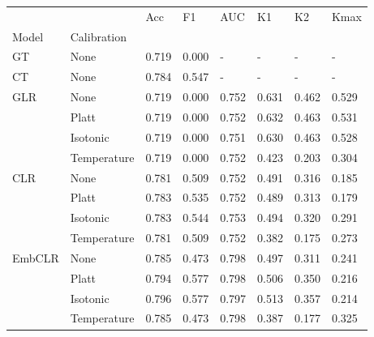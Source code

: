 \begin{tabular}{llllllll}
\toprule
 &  & Acc & F1 & AUC & K1 & K2 & Kmax \\
Model & Calibration &  &  &  &  &  &  \\
\midrule
GT & None & 0.719 & 0.000 & - & - & - & - \\
\cline{1-8}
CT & None & 0.784 & 0.547 & - & - & - & - \\
\cline{1-8}
\multirow[t]{4}{*}{GLR} & None & 0.719 & 0.000 & 0.752 & 0.631 & 0.462 & 0.529 \\
 & Platt & 0.719 & 0.000 & 0.752 & 0.632 & 0.463 & 0.531 \\
 & Isotonic & 0.719 & 0.000 & 0.751 & 0.630 & 0.463 & 0.528 \\
 & Temperature & 0.719 & 0.000 & 0.752 & 0.423 & 0.203 & 0.304 \\
\cline{1-8}
\multirow[t]{4}{*}{CLR} & None & 0.781 & 0.509 & 0.752 & 0.491 & 0.316 & 0.185 \\
 & Platt & 0.783 & 0.535 & 0.752 & 0.489 & 0.313 & 0.179 \\
 & Isotonic & 0.783 & 0.544 & 0.753 & 0.494 & 0.320 & 0.291 \\
 & Temperature & 0.781 & 0.509 & 0.752 & 0.382 & 0.175 & 0.273 \\
\cline{1-8}
\multirow[t]{4}{*}{EmbCLR} & None & 0.785 & 0.473 & 0.798 & 0.497 & 0.311 & 0.241 \\
 & Platt & 0.794 & 0.577 & 0.798 & 0.506 & 0.350 & 0.216 \\
 & Isotonic & 0.796 & 0.577 & 0.797 & 0.513 & 0.357 & 0.214 \\
 & Temperature & 0.785 & 0.473 & 0.798 & 0.387 & 0.177 & 0.325 \\
\cline{1-8}
\bottomrule
\end{tabular}
